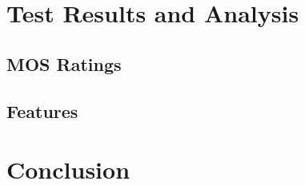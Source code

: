 \documentclass[conference]{IEEEtran}
\begin{document}
\section{Test Results and Analysis}

\subsection{MOS Ratings}
\label{sec:ratings}


\subsection{Features}
\label{sec:features}


\section{Conclusion}







\end{document}
